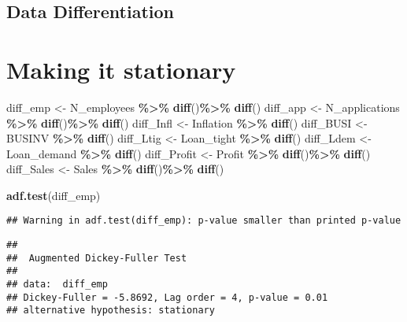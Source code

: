 \documentclass[
]{article}
\newenvironment{Shaded}{\begin{snugshade}}{\end{snugshade}}
\newcommand{\FunctionTok}[1]{\textcolor[rgb]{0.13,0.29,0.53}{\textbf{#1}}}
\newcommand{\NormalTok}[1]{#1}
\newcommand{\OtherTok}[1]{\textcolor[rgb]{0.56,0.35,0.01}{#1}}
\newcommand{\SpecialCharTok}[1]{\textcolor[rgb]{0.81,0.36,0.00}{\textbf{#1}}}
\begin{document}
\subsection{Data Differentiation}\label{data-differentiation}

\section{Making it stationary}\label{making-it-stationary}

\begin{Shaded}
\begin{Highlighting}[]
\NormalTok{diff\_emp }\OtherTok{\textless{}{-}}\NormalTok{ N\_employees }\SpecialCharTok{\%\textgreater{}\%} \FunctionTok{diff}\NormalTok{()}\SpecialCharTok{\%\textgreater{}\%} \FunctionTok{diff}\NormalTok{()}
\NormalTok{diff\_app }\OtherTok{\textless{}{-}}\NormalTok{ N\_applications }\SpecialCharTok{\%\textgreater{}\%} \FunctionTok{diff}\NormalTok{()}\SpecialCharTok{\%\textgreater{}\%} \FunctionTok{diff}\NormalTok{()}
\NormalTok{diff\_Infl }\OtherTok{\textless{}{-}}\NormalTok{ Inflation }\SpecialCharTok{\%\textgreater{}\%} \FunctionTok{diff}\NormalTok{()}
\NormalTok{diff\_BUSI }\OtherTok{\textless{}{-}}\NormalTok{ BUSINV }\SpecialCharTok{\%\textgreater{}\%} \FunctionTok{diff}\NormalTok{()}
\NormalTok{diff\_Ltig }\OtherTok{\textless{}{-}}\NormalTok{ Loan\_tight }\SpecialCharTok{\%\textgreater{}\%} \FunctionTok{diff}\NormalTok{()}
\NormalTok{diff\_Ldem }\OtherTok{\textless{}{-}}\NormalTok{ Loan\_demand }\SpecialCharTok{\%\textgreater{}\%} \FunctionTok{diff}\NormalTok{()}
\NormalTok{diff\_Profit }\OtherTok{\textless{}{-}}\NormalTok{ Profit }\SpecialCharTok{\%\textgreater{}\%} \FunctionTok{diff}\NormalTok{()}\SpecialCharTok{\%\textgreater{}\%} \FunctionTok{diff}\NormalTok{()}
\NormalTok{diff\_Sales }\OtherTok{\textless{}{-}}\NormalTok{ Sales }\SpecialCharTok{\%\textgreater{}\%} \FunctionTok{diff}\NormalTok{()}\SpecialCharTok{\%\textgreater{}\%} \FunctionTok{diff}\NormalTok{()}

\FunctionTok{adf.test}\NormalTok{(diff\_emp)}
\end{Highlighting}
\end{Shaded}

\begin{verbatim}
## Warning in adf.test(diff_emp): p-value smaller than printed p-value
\end{verbatim}

\begin{verbatim}
## 
##  Augmented Dickey-Fuller Test
## 
## data:  diff_emp
## Dickey-Fuller = -5.8692, Lag order = 4, p-value = 0.01
## alternative hypothesis: stationary
\end{verbatim}
\end{document}
